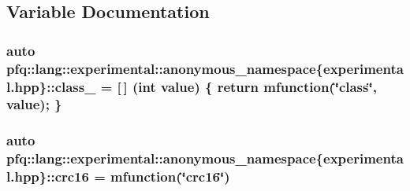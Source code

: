 \subsection{Variable Documentation}
\hypertarget{namespacepfq_1_1lang_1_1experimental_1_1anonymous__namespace_02experimental_8hpp_03_a55ce0b220b42a47460d1d40d3d5fdd5d}{
\subsubsection[{class\+\_\+}]{\setlength{\rightskip}{0pt plus 5cm}auto pfq\+::lang\+::experimental\+::anonymous\+\_\+namespace\{experimental.\+hpp\}\+::class\+\_\+ = \mbox{[}$\,$\mbox{]} (int value) \{ return {\bf mfunction}(\char`\"{}class\char`\"{}, value); \}}}\label{namespacepfq_1_1lang_1_1experimental_1_1anonymous__namespace_02experimental_8hpp_03_a55ce0b220b42a47460d1d40d3d5fdd5d}
\hypertarget{namespacepfq_1_1lang_1_1experimental_1_1anonymous__namespace_02experimental_8hpp_03_a8152d34c5c69cc26aaa2b4a14ed37af1}{
\subsubsection[{crc16}]{\setlength{\rightskip}{0pt plus 5cm}auto pfq\+::lang\+::experimental\+::anonymous\+\_\+namespace\{experimental.\+hpp\}\+::crc16 = {\bf mfunction}(\char`\"{}crc16\char`\"{})}}\label{namespacepfq_1_1lang_1_1experimental_1_1anonymous__namespace_02experimental_8hpp_03_a8152d34c5c69cc26aaa2b4a14ed37af1}
